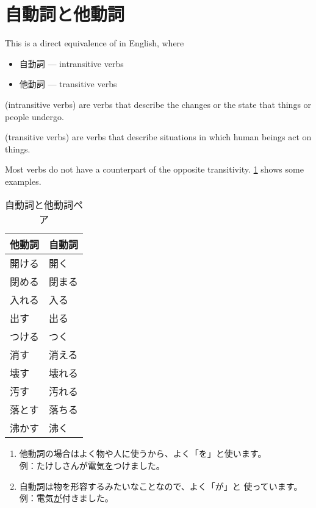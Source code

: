 \documentclass[notoc,notitlepage]{tufte-book}
\begin{document}

\section{自動詞と他動詞}%
\label{sec:jidoushi_to_tadoushi}

This is a direct equivalence of  in English, where
\begin{itemize}
  \item 自動詞 --- intransitive verbs
  \item 他動詞 --- transitive verbs
\end{itemize}

\begin{defn}[自動詞]\label{defn:jidoushi}
   (intransitive verbs) are verbs that describe the changes or
  the state that things or people undergo.
\end{defn}

\begin{defn}[他動詞]\label{defn:tadoushi}
   (transitive verbs) are verbs that describe
  situations in which human beings act on things.
\end{defn}

Most verbs do not have a counterpart of the opposite transitivity.
\cref{table:transitive_intransitive_verb_pair} shows some examples.

\begin{table}[ht]
  \centering
  \caption{自動詞と他動詞ペア}
  \label{table:transitive_intransitive_verb_pair}
  \begin{tabular}{l | l}
    他動詞 & 自動詞 \\
    \hline
    開ける & 開く \\
    閉める & 閉まる \\
    入れる & 入る \\
    出す   & 出る \\
    つける & つく \\
    消す   & 消える \\
    壊す   & 壊れる \\
    汚す   & 汚れる \\
    落とす & 落ちる \\
    沸かす & 沸く
  \end{tabular}
\end{table}

\begin{note}
  \begin{enumerate}
    \item 他動詞の場合はよく物や人に使うから、よく「を」と使います。 \\
      例：たけしさんが電気\underline{を}つけました。
    \item 自動詞は物を形容するみたいなことなので、よく「が」と
      使っています。 \\
      例：電気\underline{が}付きました。
  \end{enumerate}
\end{note}
\end{document}
